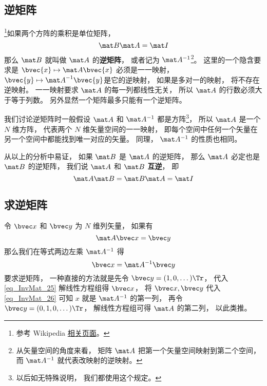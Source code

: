 
\begin{issues}
\issueTODO
\end{issues}


\subsection{逆矩阵}

\footnote{参考 Wikipedia \href{https://en.wikipedia.org/wiki/Invertible_matrix}{相关页面}。}如果两个方阵的乘积是单位矩阵， 
\begin{equation}
\mat B \mat A = \mat I
\end{equation}
那么 $\mat B$ 就叫做 $\mat A$ 的\textbf{逆矩阵}， 或者记为 $\mat A^{-1}$\footnote{从矢量空间的角度来看， 矩阵 $\mat A$ 把第一个矢量空间映射到第二个空间， 而 $\mat A^{-1}$ 就代表改映射的逆映射。}。 这里的一个隐含要求是 $\bvec{x} \mapsto \mat A \bvec{x}$ 必须是一一映射，$\bvec{y} \mapsto {\mat A}^{-1} \bvec{y}$是它的逆映射， 如果是多对一的映射， 将不存在逆映射。 一一映射要求 $\mat A$ 的每一列都线性无关，%
所以 $\mat A$ 的行数必须大于等于列数。 另外显然一个矩阵最多只能有一个逆矩阵。

我们讨论逆矩阵时一般假设 $\mat A$ 和 $\mat A^{-1}$ 都是方阵\footnote{以后如无特殊说明， 我们都使用这个规定。}， 所以 $\mat A$ 是一个 $N$ 维方阵， 代表两个 $N$ 维矢量空间的一一映射， 即每个空间中任何一个矢量在另一个空间中都能找到唯一对应的矢量。 同理， $\mat A^{-1}$ 的性质也相同。

从以上的分析中易证， 如果 $\mat B$ 是 $\mat A$ 的逆矩阵， 那么 $\mat A$ 必定也是 $\mat B$ 的逆矩阵， 我们说 $\mat A$ 和 $\mat B$ \textbf{互逆}， 即
\begin{equation}\label{eq_InvMat_2}
\mat A \mat B = \mat B \mat A = \mat I
\end{equation}

\subsection{求逆矩阵}
令 $\bvec x$ 和 $\bvec y$ 为 $N$ 维列矢量， 如果有
\begin{equation}\label{eq_InvMat_25}
\mat A \bvec x = \bvec y
\end{equation}
那么我们在等式两边左乘 $\mat A^{-1}$ 得
\begin{equation}\label{eq_InvMat_26}
\bvec x = \mat A^{-1} \bvec y
\end{equation}
要求逆矩阵， 一种直接的方法就是先令 $\bvec y = (1, 0, \dots)\Tr$， 代入\autoref{eq_InvMat_25} 解线性方程组得 $\bvec x$， 将 $\bvec x, \bvec y$ 代入\autoref{eq_InvMat_26} 可知 $x$ 就是 $\mat A^{-1}$ 的第一列， 再令 $\bvec y = (0, 1, 0, \dots)\Tr$， 解线性方程组可得 $\mat A$ 的第二列， 以此类推。

